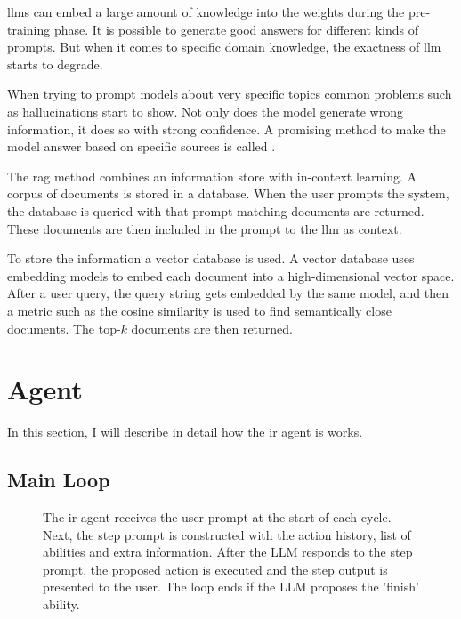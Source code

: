 \documentclass[../main.tex]{subfiles}
\begin{document}
\Glspl{llm} can embed a large amount of knowledge into the weights during the pre-training phase.
It is possible to generate good answers for different kinds of prompts.
But when it comes to specific domain knowledge, the exactness of \gls{llm} starts to degrade.

When trying to prompt models about very specific topics common problems such as hallucinations start to show.
Not only does the model generate wrong information, it does so with strong confidence.
A promising method to make the model answer based on specific sources is called .

The \gls{rag} method combines an information store with in-context learning.
A corpus of documents is stored in a database.
When the user prompts the system, the database is queried with that prompt matching documents are returned.
These documents are then included in the prompt to the \gls{llm} as context.

To store the information a vector database is used.
A vector database uses embedding models to embed each document into a high-dimensional vector space.
After a user query, the query string gets embedded by the same model,
and then a metric such as the cosine similarity is used to find semantically close documents.
The top-$k$ documents are then returned.

\section{Agent}

In this section, I will describe in detail how the \gls{ir} agent is works.


\subsection{Main Loop}

\begin{figure}[t]
    \centering
    \caption{The \gls{ir} agent receives the user prompt at the start of each cycle.
        Next, the step prompt is constructed with the action history, list of abilities and extra information.
        After the LLM responds to the step prompt, the proposed action is executed
        and the step output is presented to the user.
        The loop ends if the LLM proposes the 'finish' ability.}
    \label{fig:agent_loop}
\end{figure}
\end{document}
